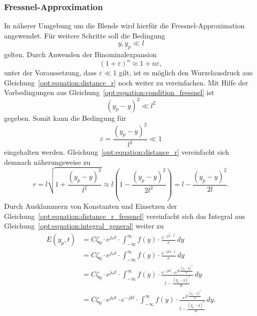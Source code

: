 \subsubsection{Fressnel-Approximation}
In näherer Umgebung um die Blende wird hierfür die Fressnel-Approximation angewendet.
Für weitere Schritte soll die Bedingung
\begin{equation}
y, y_p
\ll
l
\label{opt:equation:condition_fressnel}
\end{equation}
gelten.
Durch Anwenden der Binominalexpansion
\begin{equation}
(1 + \varepsilon)^n
\approx
1 + n\varepsilon
,
\end{equation}
unter der Voraussetzung, dass $\varepsilon \ll 1$ gilt, ist es möglich den Wurzelausdruck aus Gleichung~\ref{opt:equation:distance_r} noch weiter zu vereinfachen.
Mit Hilfe der Vorbedingungen aus Gleichung~\ref{opt:equation:condition_fressnel} ist
\begin{equation}
(y_p-y)^2
\ll
l^2
\end{equation}
gegeben.
Somit kann die Bedingung für
\begin{equation}
\varepsilon
=
\frac{(y_p-y)^2}{l^2}
\ll
1
\label{opt:equation:condition_epsilon}
\end{equation}
eingehalten werden.
Gleichung~\ref{opt:equation:distance_r} vereinfacht sich demnach näherungsweise zu
\begin{equation}
r
=
l \sqrt{1 + \frac{(y_p-y)^2}{l^2}}
\approx
l \left(1 - \frac{(y_p-y)^2}{2l^2}\right)
=
l - \frac{(y_p-y)^2}{2l}
.
\label{opt:equation:distance_r_fressnel}
\end{equation}
Durch Ausklammern von Konstanten und Einsetzen der Gleichung~\ref{opt:equation:distance_r_fressnel} vereinfacht sich das Integral aus Gleichung~\ref{opt:equation:integral_general} weiter zu
\begin{align}
E(y_p, t)
&=
C\zeta_0 \cdot e^{j\omega t} \cdot \int_{-\infty}^{\infty}f(y)\cdot\frac{e^{-j\vec{k}\cdot\vec{r}}}{r} \,dy
\\
&=
C\zeta_0 \cdot e^{j\omega t} \cdot \int_{-\infty}^{\infty}f(y)\cdot\frac{e^{-jkr \cdot 1}}{r} \,dy
\\
&=
C\zeta_0 \cdot e^{j\omega t} \cdot \int_{-\infty}^{\infty}f(y)\cdot\frac{e^{-jkl} \cdot e^{jk\frac{(y_p-y)^2}{2l}}}{l - \frac{(y_p-y)^2}{2l}} \,dy
\\
&=
C\zeta_0 \cdot e^{j\omega t} \cdot e^{-jkl} \cdot \int_{-\infty}^{\infty}f(y)\cdot\frac{e^{jk\frac{(y_p-y)^2}{2l}}}{l - \frac{(y_p-y)^2}{2l}} \,dy
.
\end{align}

